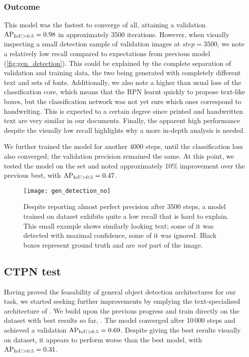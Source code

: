 		\subsubsection*{Outcome}

			This model was the fastest to converge of all, attaining a validation \(\operatorname{\operatorname{AP}_{\operatorname{IoU} > 0.5}} = 0.98\) in approximately 3500 iterations. However, when visually inspecting a small detection sample of validation images at \(\mathit{step} = 3500\), we note a relatively low recall compared to expectations from previous model (\autoref{fig:gen_detection}). This could be explained by the complete separation of validation and training data, the two being generated with completely different text and sets of fonts. Additionally, we also note a higher than usual loss of the classification core, which means that the RPN learnt quickly to propose text-like boxes, but the classification network was not yet sure which ones correspond to handwriting. This is expected to a certain degree since printed and handwritten text are very similar in our documents. Finally, the apparent high performance despite the visually low recall highlights why a more in-depth analysis is needed.

			We further trained the model for another 4000 steps, until the classification loss also converged; the validation precision remained the same. At this point, we tested the model on the  set and noted approximately 10\% improvement over the previous best, with \(\operatorname{\operatorname{AP}_{\operatorname{IoU} > 0.5}} = 0.47\).

			\begin{figure}
				{
					\caption[ detection]{Despite reporting almost perfect precision after 3500 steps, a \FRCNN{} model trained on  dataset exhibits quite a low recall that is hard to explain. This small example shows similarly looking text; some of it was detected with maximal confidence, some of it was ignored. Black boxes represent ground truth and are \emph{not} part of the image. }
					\label{fig:gen_detection}
				}
				{\texttt{[image: gen\_detection\_no]}}
			\end{figure}

	\subsection{CTPN test}
		Having proved the feasability of general object detection architectures for our task, we started seeking further improvements by emplying the text-specialised architecture of \CTPN{}. We build upon the previous progress and train directly on the dataset with best results so far, . The model converged after 10\,000 steps and achieved a validation \(\operatorname{\operatorname{AP}_{\operatorname{IoU} > 0.5}} = 0.69\). Despite giving the best results visually on  dataset, it appears to perform worse than the best \FRCNN{} model, with \(\operatorname{\operatorname{AP}_{\operatorname{IoU} > 0.5}} = 0.31\).


